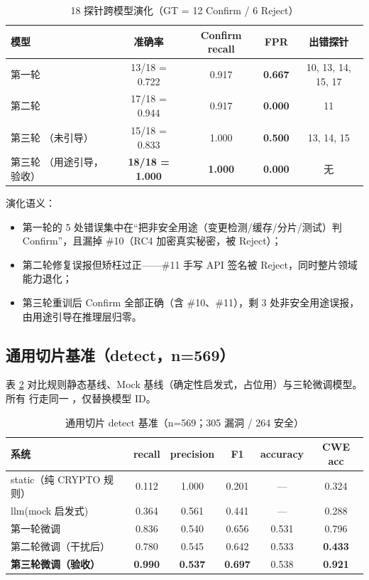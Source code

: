 \documentclass[11pt,a4paper,fontset=none]{ctexart}
\newcommand{\code}[1]{\begingroup\ttfamily\small\detokenize{#1}\endgroup}
\begin{document}
\begin{table}[htbp]
\centering
\caption{18 探针跨模型演化（GT = 12 Confirm / 6 Reject）}
\label{tab:probes}
\small
\begin{tabular}{@{}>{\raggedright\arraybackslash}p{5.0cm}cccc@{}}
\toprule
模型 & 准确率 & Confirm recall & FPR & 出错探针 \\
\midrule
第一轮 \code{...510facca98f1} & 13/18 = 0.722 & 0.917 & \textbf{0.667} & 10, 13, 14, 15, 17 \\
第二轮 \code{...da015253d244} & 17/18 = 0.944 & 0.917 & \textbf{0.000} & 11 \\
第三轮 \code{...f5d4f1aedd8f}（未引导） & 15/18 = 0.833 & 1.000 & \textbf{0.500} & 13, 14, 15 \\
第三轮 \code{...f5d4f1aedd8f}（用途引导，验收） & \textbf{18/18 = 1.000} & \textbf{1.000} & \textbf{0.000} & 无 \\
\bottomrule
\end{tabular}
\end{table}

演化语义：
\begin{itemize}
  \item 第一轮的 5 处错误集中在“把非安全用途（变更检测/缓存/分片/测试）判 Confirm”，且漏掉 \#10（RC4
    加密真实秘密，被 Reject）；
  \item 第二轮修复误报但矫枉过正——\#11 手写 API 签名被 Reject，同时整片领域能力退化；
  \item 第三轮重训后 Confirm 全部正确（含 \#10、\#11），剩 3 处非安全用途误报，由用途引导在推理层归零。
\end{itemize}

\subsection{通用切片基准（detect，n=569）}
表 \ref{tab:detect} 对比规则静态基线、Mock 基线（确定性启发式，占位用）与三轮微调模型。所有
\code{llm} 行走同一 \code{CloudBackend}，仅替换模型 ID。

\begin{table}[htbp]
\centering
\caption{通用切片 detect 基准（n=569；305 漏洞 / 264 安全）}
\label{tab:detect}
\small
\begin{tabular}{@{}lccccc@{}}
\toprule
系统 & recall & precision & F1 & accuracy & CWE acc \\
\midrule
static（纯 CRYPTO 规则） & 0.112 & 1.000 & 0.201 & --- & 0.324 \\
llm(mock 启发式) & 0.364 & 0.561 & 0.441 & --- & 0.288 \\
\midrule
第一轮微调 & 0.836 & 0.540 & 0.656 & 0.531 & 0.796 \\
第二轮微调（干扰后） & 0.780 & 0.545 & 0.642 & 0.533 & \textbf{0.433} \\
\textbf{第三轮微调（验收）} & \textbf{0.990} & \textbf{0.537} & \textbf{0.697} & 0.538 & \textbf{0.921} \\
\bottomrule
\end{tabular}
\end{table}
\end{document}
